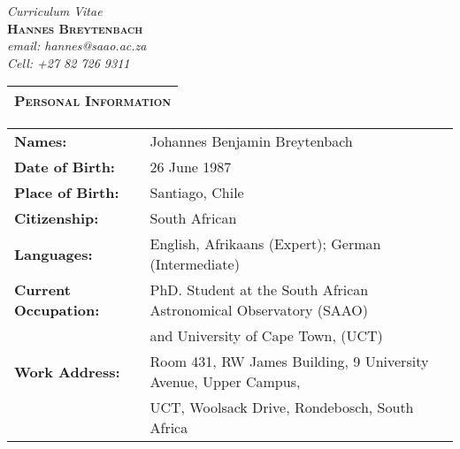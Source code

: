 \documentclass{article}
\renewcommand{\section}[1]{
  \vspace{0.4cm}
  \begin{table}[!htp]					%
    \newcolumntype{C}{>{\centering\arraybackslash}X}	%
    \setlength\extrarowheight{3pt} 			%

    \noindent 						%
    \begin{tabularx}{\textwidth}{C}
    \hline \hline 
      \large \textbf{ \textsc{#1} } \\ 
    \hline \hline
    \end{tabularx}
  \end{table}
}
\begin{document}
 
\thispagestyle{empty} %

\begin{center}
  \large\emph{Curriculum Vitae}\\
  \vspace{0.4cm}
  \huge \textbf{\textsc{Hannes Breytenbach}}\\
  \vspace{0.2cm}
  \normalsize
  \emph{email: hannes@saao.ac.za}\\
  \emph{Cell: +27 82 726 9311}\\

\end{center}


\section{Personal Information}
\begin{tabular}[h!]{l l} 
  \textbf{Names:}		& Johannes Benjamin Breytenbach\\
  \textbf{Date of Birth:}	& 26 June 1987	\\
  \textbf{Place of Birth:}	& Santiago, Chile\\
  \textbf{Citizenship:}		& South African\\
  \textbf{Languages:}		& English, Afrikaans (Expert); German (Intermediate) \\
  \textbf{Current Occupation:}	& PhD. Student at the South African Astronomical Observatory (SAAO) \\& and University of Cape Town, (UCT)\\
  \textbf{Work Address:}	& Room 431, RW James Building, 9 University Avenue, Upper Campus,\\& UCT, Woolsack Drive, Rondebosch, South Africa
\end{tabular}
\end{document}
